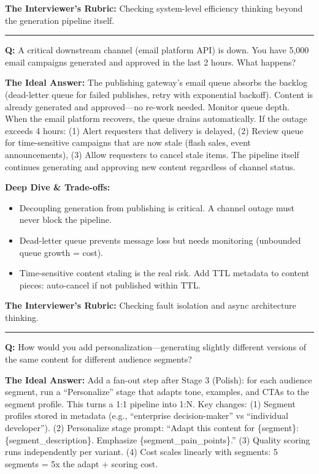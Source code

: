 \textbf{The Interviewer's Rubric:} Checking system-level efficiency thinking beyond the generation pipeline itself.

\bigskip\hrule\bigskip

\textbf{Q:} A critical downstream channel (email platform API) is down. You have 5,000 email campaigns generated and approved in the last 2 hours. What happens?

\textbf{The Ideal Answer:} The publishing gateway's email queue absorbs the backlog (dead-letter queue for failed publishes, retry with exponential backoff). Content is already generated and approved---no re-work needed. Monitor queue depth. When the email platform recovers, the queue drains automatically. If the outage exceeds 4 hours: (1) Alert requesters that delivery is delayed, (2) Review queue for time-sensitive campaigns that are now stale (flash sales, event announcements), (3) Allow requesters to cancel stale items. The pipeline itself continues generating and approving new content regardless of channel status.

\textbf{Deep Dive \& Trade-offs:}
\begin{itemize}
  \item Decoupling generation from publishing is critical. A channel outage must never block the pipeline.
  \item Dead-letter queue prevents message loss but needs monitoring (unbounded queue growth = cost).
  \item Time-sensitive content staling is the real risk. Add TTL metadata to content pieces: auto-cancel if not published within TTL.
\end{itemize}

\textbf{The Interviewer's Rubric:} Checking fault isolation and async architecture thinking.

\bigskip\hrule\bigskip

\textbf{Q:} How would you add personalization---generating slightly different versions of the same content for different audience segments?

\textbf{The Ideal Answer:} Add a fan-out step after Stage 3 (Polish): for each audience segment, run a ``Personalize'' stage that adapts tone, examples, and CTAs to the segment profile. This turns a 1:1 pipeline into 1:N. Key changes: (1) Segment profiles stored in metadata (e.g., ``enterprise decision-maker'' vs ``individual developer''). (2) Personalize stage prompt: ``Adapt this content for \{segment\}: \{segment\_description\}. Emphasize \{segment\_pain\_points\}.'' (3) Quality scoring runs independently per variant. (4) Cost scales linearly with segments: 5 segments = 5x the adapt + scoring cost.

